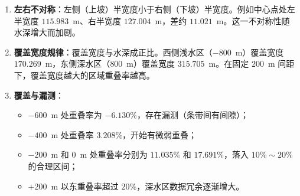 \documentclass[12pt,a4paper]{ctexart}
\begin{document}
 \begin{enumerate}
     \item \textbf{左右不对称}：左侧（上坡）半宽度小于右侧（下坡）半宽度。例如中心点处左半宽度 $115.983$~m、右半宽度 $127.004$~m，差约 $11.021$~m。这一不对称性随水深增大而加剧。
     \item \textbf{覆盖宽度规律}：覆盖宽度与水深成正比。西侧浅水区（$-800$~m）覆盖宽度 $170.269$~m，东侧深水区（$800$~m）覆盖宽度 $315.705$~m。在固定 $200$~m 间距下，覆盖宽度越大的区域重叠率越高。
     \item \textbf{覆盖与漏测}：
         \begin{itemize}
             \item $-600$~m 处重叠率为 $-6.130\%$，存在漏测（条带间有间隙）；
             \item $-400$~m 处重叠率 $3.208\%$，开始有微弱重叠；
             \item $-200$~m 和 $0$~m 处重叠率分别为 $11.035\%$ 和 $17.691\%$，落入 $10\%\sim20\%$ 的合理区间；
             \item $+200$~m 以东重叠率超过 $20\%$，深水区数据冗余逐渐增大。
         \end{itemize}
 \end{enumerate}
 
 
\end{document}
